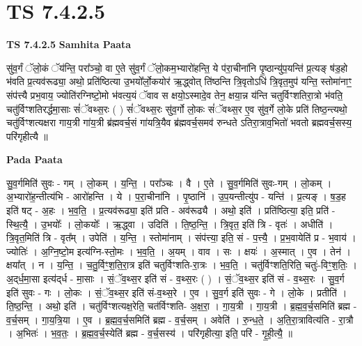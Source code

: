\documentclass[17pt]{extarticle}
\begin{document}

\section{ TS 7.4.2.5 }

\textbf{TS 7.4.2.5 } \newline
\textbf{Samhita Paata} \newline

सु॑व॒र्गं ॅलो॒कं ॅय॑न्ति॒ परा᳚ञ्चो॒ वा ए॒ते सु॑व॒र्गं ॅलो॒कम॒भ्यारो॑हन्ति॒ ये प॑रा॒चीना॑नि पृ॒ष्ठान्यु॑प॒यन्ति॑ प्र॒त्यङ् ष॑ड॒हो भ॑वति प्र॒त्यव॑रूढ्या॒ अथो॒ प्रति॑ष्ठित्या उ॒भयो᳚र्लो॒कयोर॑ ऋ॒द्ध्वोत् ति॑ष्ठन्ति त्रि॒वृतोऽधि॑ त्रि॒वृत॒मुप॑ यन्ति॒ स्तोमा॑नाꣳ॒॒ संप॑त्त्यै प्रभ॒वाय॒ ज्योति॑रग्निष्टो॒मो भ॑वत्य॒यं ॅवाव स क्षयो॒ऽस्मादे॒व तेन॒ क्षया॒न्न य॑न्ति चतुर्विꣳशतिरा॒त्रो भ॑वति॒ चतु॑र्विꣳशतिरर्द्धमा॒साः सं॑ॅवथ्स॒रः ( ) सं॑ॅवथ्स॒रः सु॑व॒र्गो लो॒कः सं॑ॅवथ्स॒र ए॒व सु॑व॒र्गे लो॒के प्रति॑ तिष्ठ॒न्त्यथो॒ चतु॑र्विꣳशत्यक्षरा गाय॒त्री गा॑य॒त्री ब्र॑ह्मवर्च॒सं गा॑यत्रि॒यैव ब्र॑ह्मवर्च॒समव॑ रुन्धते ऽतिरा॒त्राव॒भितो॑ भवतो ब्रह्मवर्च॒सस्य॒ परि॑गृहीत्यै ॥ \newline

\textbf{Pada Paata} \newline

सु॒व॒र्गमिति॑ सुवः - गम् । लो॒कम् । य॒न्ति॒ । परा᳚ञ्चः । वै । ए॒ते । सु॒व॒र्गमिति॑ सुवः-गम् । लो॒कम् । अ॒भ्यारो॑ह॒न्तीत्य॑भि - आरो॑हन्ति । ये । प॒रा॒चीना॑नि । पृ॒ष्ठानि॑ । उ॒प॒यन्तीत्यु॑प - यन्ति॑ । प्र॒त्यङ् । ष॒ड॒ह इति॑ षट् - अ॒हः । भ॒व॒ति॒ । प्र॒त्यव॑रूढ्या॒ इति॑ प्रति - अव॑रूढ्यै । अथो॒ इति॑ । प्रति॑ष्ठित्या॒ इति॒ प्रति॑ - स्थि॒त्यै॒ । उ॒भयोः᳚ । लो॒कयोः᳚ । ऋ॒द्ध्वा । उदिति॑ । ति॒ष्ठ॒न्ति॒ । त्रि॒वृत॒ इति॑ त्रि - वृतः॑ । अधीति॑ । त्रि॒वृत॒मिति॑ त्रि - वृत᳚म् । उपेति॑ । य॒न्ति॒ । स्तोमा॑नाम् । संप॑त्त्या॒ इति॒ सं - प॒त्त्यै॒ । प्र॒भ॒वायेति॑ प्र - भ॒वाय॑ । ज्योतिः॑ । अ॒ग्नि॒ष्टो॒म इत्य॑ग्नि-स्तो॒मः । भ॒व॒ति॒ । अ॒यम् । वाव । सः । क्षयः॑ । अ॒स्मात् । ए॒व । तेन॑ । क्षया᳚त् । न । य॒न्ति॒ । च॒तु॒र्विꣳ॒॒श॒ति॒रा॒त्र इति॑ चतुर्विꣳशति-रा॒त्रः । भ॒व॒ति॒ । चतु॑र्विꣳशति॒रिति॒ चतुः॑-विꣳ॒॒श॒तिः॒ । अ॒द्‌र्ध॒मा॒सा इत्य॑द्‌र्ध - मा॒साः । सं॒ॅव॒थ्स॒र इति॑ सं - व॒थ्स॒रः ( ) । सं॒ॅव॒थ्स॒र इति॑ सं - व॒थ्स॒रः । सु॒व॒र्ग इति॑ सुवः - गः । लो॒कः । सं॒ॅव॒थ्स॒र इति॑ सं-व॒थ्स॒रे । ए॒व । सु॒व॒र्ग इति॑ सुवः - गे । लो॒के । प्रतीति॑ । ति॒ष्ठ॒न्ति॒ । अथो॒ इति॑ । चतु॑र्विꣳशत्यक्ष॒रेति॒ चत॑र्विꣳशति- अ॒क्ष॒रा॒ । गा॒य॒त्री । गा॒य॒त्री । ब्र॒ह्म॒व॒र्च॒समिति॑ ब्रह्म - व॒र्च॒सम् । गा॒य॒त्रि॒या । ए॒व । ब्र॒ह्म॒व॒र्च॒समिति॑ ब्रह्म - व॒र्च॒सम् । अवेति॑ । रु॒न्ध॒ते॒ । अ॒ति॒रा॒त्रावित्य॑ति - रा॒त्रौ । अ॒भितः॑ । भ॒व॒तः॒ । ब्र॒ह्म॒व॒र्च॒स्येति॑ ब्रह्म - व॒र्च॒सस्य॑ । परि॑गृहीत्या॒ इति॒ परि॑ - गृ॒ही॒त्यै॒ ॥  \newline
\end{document}
